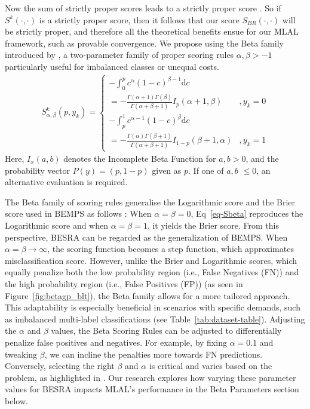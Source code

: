 \documentclass[letterpaper]{article} %
\begin{document}
Now the sum of strictly proper scores leads to a strictly proper score \cite{dawid2014theory}.  So if $S^k(\cdot,\cdot)$ is a strictly proper score, then it follows that our  score $S_{BR}(\cdot,\cdot)$ will be strictly proper, and therefore all the theoretical benefits ensue for our MLAL framework, such as provable convergence.
We propose using the Beta family introduced by \cite{Buja2005Loss}, a two-parameter family of proper scoring rules
$\alpha,\beta > -1$ particularly useful for imbalanced classes or unequal costs.
{\scriptsize
\begin{eqnarray} 
\label{eq-Sbeta}
S^k_{\alpha,\beta}(p,y_k) = \left\{
  \begin{array}{lr}
    - \int_0^p c^\alpha (1-c)^{\beta-1} \mbox{d}c  \\ =
         - \frac{\Gamma(\alpha+1)\Gamma(\beta)}{\Gamma(\alpha+\beta+1)} I_p(\alpha+1,\beta)
          & , y_k=0\\
    - \int_p^1 c^{\alpha-1} (1-c)^{\beta} \mbox{d}c \\ 
    =
         - \frac{\Gamma(\alpha)\Gamma(\beta+1)}{\Gamma(\alpha+\beta+1)} I_{1-p}(\beta+1,\alpha) & ,y_k=1
\end{array} \right.
\end{eqnarray}}
\noindent
Here, $I_x(a,b)$ denotes the Incomplete Beta Function for $a,b>0$, 
and the probability vector $P(y)=(p, 1-p)$ given as $p$. 
If one of $a,b$ $\le 0$, an alternative evaluation is required. 

The Beta family of scoring rules generalise the Logarithmic score and the Brier score used in BEMPS as follows \cite{merkle2013choosing}:
When $\alpha=\beta=0$, Eq~\eqref{eq-Sbeta} reproduces the Logarithmic score
and when $\alpha=\beta=1$, it yields the Brier score.
From this perspective, BESRA can be regarded as the generalization of BEMPS.
When $\alpha = \beta \rightarrow \infty$, the scoring function becomes a step function, which approximates misclassification score. 
However, unlike the Brier and Logarithmic scores, which equally penalize both the low probability region (i.e., False Negatives (FN)) and the high probability region (i.e., False Positives (FP)) (as seen in Figure~\ref{fig:betagp_blt}), the Beta family allows for a more tailored approach. 
This adaptability is especially beneficial in scenarios with specific demands, such as imbalanced multi-label classifications (see Table~\ref{tab:dataset-table}).
Adjusting the $\alpha$ and $\beta$ values, the Beta Scoring Rules can be adjusted to differentially penalize false positives and negatives.
For example, by fixing $\alpha=0.1$ and tweaking $\beta$, we can incline the penalties more towards FN predictions.
Conversely, selecting the right $\beta$ and $\alpha$ is critical and varies based on the problem, as highlighted in \citep{merkle2013choosing, doi:10.1198/016214506000001437}. Our research explores how varying these parameter values for BESRA impacts MLAL's performance in the Beta Parameters section below. 
\end{document}
